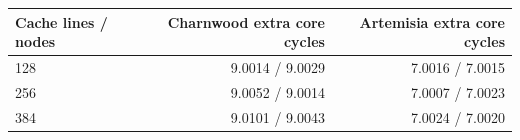 \begin{tabular}{lrr}
\toprule
Cache lines / nodes & Charnwood extra core cycles & Artemisia extra core cycles \\
\midrule
128 & 9.0014 / 9.0029 & 7.0016 / 7.0015 \\
256 & 9.0052 / 9.0014 & 7.0007 / 7.0023 \\
384 & 9.0101 / 9.0043 & 7.0024 / 7.0020 \\
\bottomrule
\end{tabular}
